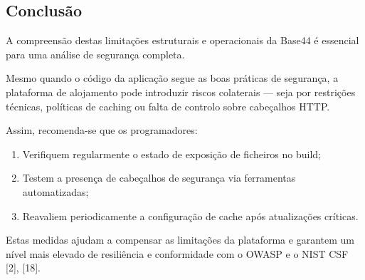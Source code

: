 \subsection{Conclusão}

A compreensão destas limitações estruturais e operacionais da Base44 é essencial para uma análise de segurança completa.

Mesmo quando o código da aplicação segue as boas práticas de segurança, a plataforma de alojamento pode introduzir riscos colaterais — seja por restrições técnicas, políticas de caching ou falta de controlo sobre cabeçalhos HTTP.

Assim, recomenda-se que os programadores:

\begin{enumerate}

    \item Verifiquem regularmente o estado de exposição de ficheiros no build;

    \item Testem a presença de cabeçalhos de segurança via ferramentas automatizadas;

    \item Reavaliem periodicamente a configuração de cache após atualizações críticas.

\end{enumerate}

Estas medidas ajudam a compensar as limitações da plataforma e garantem um nível mais elevado de resiliência e conformidade com o OWASP e o NIST CSF [2], [18].
